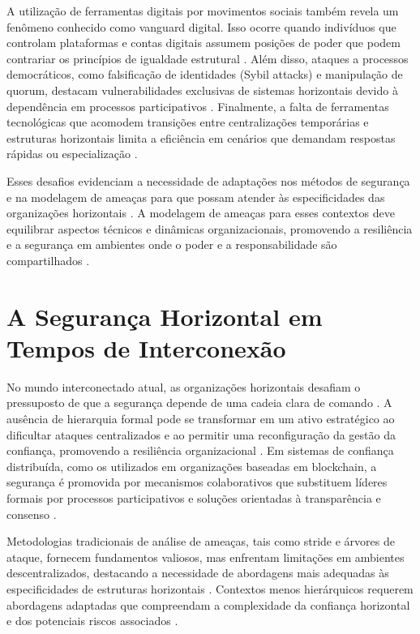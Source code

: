 A utilização de ferramentas digitais por movimentos sociais também revela um
fenômeno conhecido como vanguard digital. Isso ocorre quando indivíduos que
controlam plataformas e contas digitais assumem posições de poder que podem
contrariar os princípios de igualdade estrutural
\cite{SocialMediaTeamsAsDigitalVanguards}. Além disso, ataques a processos
democráticos, como falsificação de identidades (Sybil attacks) e manipulação de
quorum, destacam vulnerabilidades exclusivas de sistemas horizontais devido à
dependência em processos participativos \cite{MitigationSybilAttack,
TheSybilAttack, Reputation-basedDAO}. Finalmente, a falta de ferramentas tecnológicas que acomodem
transições entre centralizações temporárias e estruturas horizontais limita a
eficiência em cenários que demandam respostas rápidas ou especialização
\cite{Colbac, ParticipatoryThreatModelling}.

Esses desafios evidenciam a necessidade de adaptações nos métodos de segurança e
na modelagem de ameaças para que possam atender às especificidades das
organizações horizontais \cite{Colbac}. A modelagem de ameaças para esses contextos deve
equilibrar aspectos técnicos e dinâmicas organizacionais, promovendo a
resiliência e a segurança em ambientes onde o poder e a responsabilidade são
compartilhados \cite{ThreatModelingdesigningForSecurity, EvaluationofCompetingThreatModeling}.

\section{A Segurança Horizontal em Tempos de Interconexão}
\label{sec:desafios_contemporaneos}

No mundo interconectado atual, as organizações horizontais desafiam o
pressuposto de que a segurança depende de uma cadeia clara de comando
\cite{Non-HierarchicalForms, EverydayRevolutions}.
A ausência de hierarquia formal pode se transformar em um ativo estratégico
ao dificultar ataques centralizados e ao permitir uma reconfiguração da
gestão da confiança, promovendo a resiliência organizacional
\cite{EverydayRevolutions, Colbac}. Em sistemas de confiança distribuída,
como os utilizados em organizações baseadas em blockchain,
a segurança é promovida por mecanismos colaborativos que
substituem líderes formais por processos participativos e soluções
orientadas à transparência e consenso \cite{Reputation-basedDAO, AbcCrypto}.

Metodologias tradicionais de análise de ameaças, tais como \gls{stride} e árvores
de ataque, fornecem fundamentos valiosos, mas enfrentam limitações em
ambientes descentralizados, destacando a necessidade de abordagens mais
adequadas às especificidades de estruturas horizontais
\cite{ThreatModellingSurvey, ThreatModelingASummaryOfAvailableMethods}.
Contextos menos hierárquicos requerem abordagens adaptadas
que compreendam a complexidade da confiança horizontal
e dos potenciais riscos associados \cite{Colbac}.


